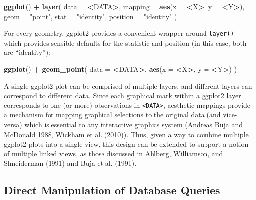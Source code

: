 \documentclass[12pt,]{article}
\newenvironment{Shaded}{\begin{snugshade}}{\end{snugshade}}
\newcommand{\KeywordTok}[1]{\textcolor[rgb]{0.13,0.29,0.53}{\textbf{#1}}}
\newcommand{\DataTypeTok}[1]{\textcolor[rgb]{0.13,0.29,0.53}{#1}}
\newcommand{\StringTok}[1]{\textcolor[rgb]{0.31,0.60,0.02}{#1}}
\newcommand{\OperatorTok}[1]{\textcolor[rgb]{0.81,0.36,0.00}{\textbf{#1}}}
\newcommand{\NormalTok}[1]{#1}
\theoremstyle{definition}
\theoremstyle{definition}
\theoremstyle{remark}
\begin{document}
\begin{Shaded}
\begin{Highlighting}[]
\KeywordTok{ggplot}\NormalTok{() }\OperatorTok{+}\StringTok{ }\KeywordTok{layer}\NormalTok{(}
  \DataTypeTok{data =} \OperatorTok{<}\NormalTok{DATA}\OperatorTok{>}\NormalTok{, }
  \DataTypeTok{mapping =} \KeywordTok{aes}\NormalTok{(}\DataTypeTok{x =} \OperatorTok{<}\NormalTok{X}\OperatorTok{>}\NormalTok{, }\DataTypeTok{y =} \OperatorTok{<}\NormalTok{Y}\OperatorTok{>}\NormalTok{), }
  \DataTypeTok{geom =} \StringTok{"point"}\NormalTok{, }
  \DataTypeTok{stat =} \StringTok{"identity"}\NormalTok{,}
  \DataTypeTok{position =} \StringTok{"identity"}
\NormalTok{)}
\end{Highlighting}
\end{Shaded}

For every geometry, ggplot2 provides a convenient wrapper around
\texttt{layer()} which provides sensible defaults for the statistic and
position (in this case, both are ``identity''):

\begin{Shaded}
\begin{Highlighting}[]
\KeywordTok{ggplot}\NormalTok{() }\OperatorTok{+}\StringTok{ }\KeywordTok{geom_point}\NormalTok{(}
  \DataTypeTok{data =} \OperatorTok{<}\NormalTok{DATA}\OperatorTok{>}\NormalTok{, }
  \KeywordTok{aes}\NormalTok{(}\DataTypeTok{x =} \OperatorTok{<}\NormalTok{X}\OperatorTok{>}\NormalTok{, }\DataTypeTok{y =} \OperatorTok{<}\NormalTok{Y}\OperatorTok{>}\NormalTok{)}
\NormalTok{)}
\end{Highlighting}
\end{Shaded}

A single ggplot2 plot can be comprised of multiple layers, and different
layers can correspond to different data. Since each graphical mark
within a ggplot2 layer corresponds to one (or more) observations in
\texttt{\textless{}DATA\textgreater{}}, aesthetic mappings provide a
mechanism for mapping graphical selections to the original data (and
vice-versa) which is essential to any interactive graphics system
(Andreas Buja and McDonald 1988, Wickham et al. (2010)). Thus, given a
way to combine multiple ggplot2 plots into a single view, this design
can be extended to support a notion of multiple linked views, as those
discussed in Ahlberg, Williamson, and Shneiderman (1991) and Buja et al.
(1991).

\subsection{Direct Manipulation of Database Queries}\label{extension}
\end{document}

